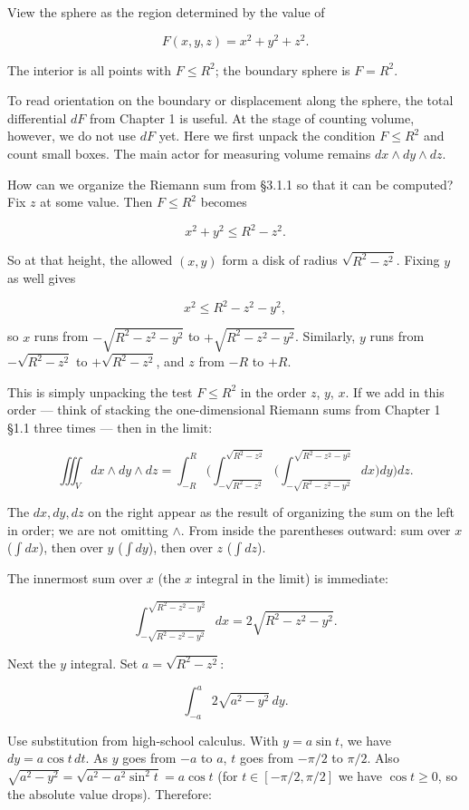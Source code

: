 View the sphere as the region determined by the value of

\[F(x,y,z)=x^2+y^2+z^2.\]

The interior is all points with \(F\le R^2\); the boundary sphere is
\(F=R^2\).

To read orientation on the boundary or displacement along the sphere,
the total differential \(dF\) from Chapter 1 is useful. At the stage of
counting volume, however, we do not use \(dF\) yet. Here we first unpack
the condition \(F\le R^2\) and count small boxes. The main actor for
measuring volume remains \(dx\wedge dy\wedge dz\).

How can we organize the Riemann sum from §3.1.1 so that it can be
computed? Fix \(z\) at some value. Then \(F\le R^2\) becomes

\[x^2+y^2\le R^2-z^2.\]

So at that height, the allowed \((x,y)\) form a disk of radius
\(\sqrt{R^2-z^2}\). Fixing \(y\) as well gives

\[x^2\le R^2-z^2-y^2,\]

so \(x\) runs from \(-\sqrt{R^2 - z^2 - y^2}\) to
\(+\sqrt{R^2 - z^2 - y^2}\). Similarly, \(y\) runs from
\(-\sqrt{R^2 - z^2}\) to \(+\sqrt{R^2 - z^2}\), and \(z\) from \(-R\) to
\(+R\).

This is simply unpacking the test \(F\le R^2\) in the order \(z\),
\(y\), \(x\). If we add in this order --- think of stacking the
one-dimensional Riemann sums from Chapter 1 §1.1 three times --- then in
the limit:

\[\iiint_V dx \wedge dy \wedge dz = \int_{-R}^{R} \Biggl( \int_{-\sqrt{R^2 - z^2}}^{\sqrt{R^2 - z^2}} \Biggl( \int_{-\sqrt{R^2 - z^2 - y^2}}^{\sqrt{R^2 - z^2 - y^2}} dx \Biggr) dy \Biggr) dz.\]

The \(dx, dy, dz\) on the right appear as the result of organizing the
sum on the left in order; we are not omitting \(\wedge\). From inside
the parentheses outward: sum over \(x\) (\(\int dx\)), then over \(y\)
(\(\int dy\)), then over \(z\) (\(\int dz\)).

The innermost sum over \(x\) (the \(x\) integral in the limit) is
immediate:

\[\int_{-\sqrt{R^2 - z^2 - y^2}}^{\sqrt{R^2 - z^2 - y^2}} dx = 2\sqrt{R^2 - z^2 - y^2}.\]

Next the \(y\) integral. Set \(a = \sqrt{R^2 - z^2}\):

\[\int_{-a}^{a} 2\sqrt{a^2 - y^2}\,dy.\]

Use substitution from high-school calculus. With \(y = a\sin t\), we
have \(dy = a\cos t\,dt\). As \(y\) goes from \(-a\) to \(a\), \(t\)
goes from \(-\pi/2\) to \(\pi/2\). Also
\(\sqrt{a^2 - y^2} = \sqrt{a^2 - a^2\sin^2 t} = a\cos t\) (for
\(t \in [-\pi/2,\pi/2]\) we have \(\cos t \ge 0\), so the absolute value
drops). Therefore:

